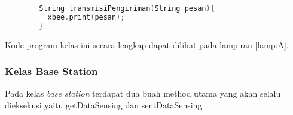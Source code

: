 \begin{itemize}
        \begin{lstlisting}[label=transmisiPengiriman, language=C, caption=Metode transmisiPengiriman(), numbers=none]
        
        String transmisiPengiriman(String pesan){
          xbee.print(pesan);
        }
        \end{lstlisting}
        
        
        
    \end{itemize}
   
   Kode program kelas ini secara lengkap dapat dilihat pada lampiran \ref{lamp:A}.
   
   \subsubsection{Kelas Base Station}
   
   Pada kelas \textit{base station} terdapat dua buah method utama yang akan selalu dieksekusi yaitu getDataSensing dan sentDataSensing. 
   
